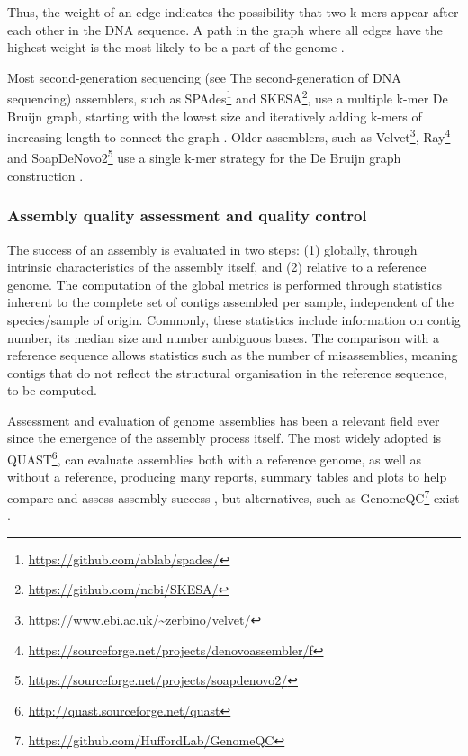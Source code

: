 Thus, the weight of an edge indicates the possibility that two k-mers appear after each other in the DNA sequence. A path in the graph where all edges have the highest weight is the most likely to be a part of the genome \citep{bayat_methods_2020}.

Most second-generation sequencing (see  The second-generation of DNA sequencing) assemblers, such as SPAdes\footnote{\url{https://github.com/ablab/spades/}} and  SKESA\footnote{\url{https://github.com/ncbi/SKESA/}}, use a multiple k-mer De Bruijn graph, starting with the lowest size and iteratively adding k-mers of increasing length to connect the graph \citep{bankevich_spades_2012, souvorov_skesa_2018, li_megahit_2015}. Older assemblers, such as Velvet\footnote{\url{https://www.ebi.ac.uk/~zerbino/velvet/}}, Ray\footnote{\url{https://sourceforge.net/projects/denovoassembler/f}} and SoapDeNovo2\footnote{\url{https://sourceforge.net/projects/soapdenovo2/}} use a single k-mer strategy for the De Bruijn graph construction \citep{zerbino_velvet_2008, boisvert_ray_2010, luo_soapdenovo2_2012}. 

\subsubsection{Assembly quality assessment and quality control} \label{ssec:_intro_assembly_quality}

The success of an assembly is evaluated in two steps: (1) globally, through intrinsic characteristics of the assembly itself, and (2) relative to a reference genome. The computation of the global metrics is performed through statistics inherent to the complete set of contigs assembled per sample, independent of the species/sample of origin. Commonly, these statistics include information on contig number, its median size and number ambiguous bases. The comparison with a reference sequence allows statistics such as the number of misassemblies, meaning contigs that do not reflect the structural organisation in the reference sequence, to be computed. 

Assessment and evaluation of genome assemblies has been a relevant field ever since the emergence of the assembly process itself. 
The most widely adopted is QUAST\footnote{\url{http://quast.sourceforge.net/quast}}, can evaluate assemblies both with a reference genome, as well as without a reference, producing many reports, summary tables and plots to help compare and assess assembly success \citep{gurevich_quast_2013}, but alternatives, such as GenomeQC\footnote{\url{https://github.com/HuffordLab/GenomeQC}} exist \citep{manchanda_genomeqc_2020}. 

